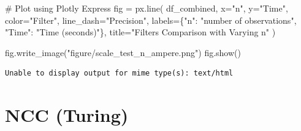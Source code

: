 \documentclass[
]{report}
\newenvironment{Shaded}{\begin{snugshade}}{\end{snugshade}}
\newcommand{\CommentTok}[1]{\textcolor[rgb]{0.37,0.37,0.37}{#1}}
\newcommand{\NormalTok}[1]{\textcolor[rgb]{0.00,0.23,0.31}{#1}}
\newcommand{\OperatorTok}[1]{\textcolor[rgb]{0.37,0.37,0.37}{#1}}
\newcommand{\StringTok}[1]{\textcolor[rgb]{0.13,0.47,0.30}{#1}}
\begin{document}
\begin{Shaded}
\begin{Highlighting}[]
\CommentTok{\# Plot using Plotly Express}
\NormalTok{fig }\OperatorTok{=}\NormalTok{ px.line(}
\NormalTok{    df\_combined,}
\NormalTok{    x}\OperatorTok{=}\StringTok{"n"}\NormalTok{,}
\NormalTok{    y}\OperatorTok{=}\StringTok{"Time"}\NormalTok{,}
\NormalTok{    color}\OperatorTok{=}\StringTok{"Filter"}\NormalTok{,}
\NormalTok{    line\_dash}\OperatorTok{=}\StringTok{"Precision"}\NormalTok{,}
\NormalTok{    labels}\OperatorTok{=}\NormalTok{\{}\StringTok{"n"}\NormalTok{: }\StringTok{"number of observations"}\NormalTok{, }\StringTok{"Time"}\NormalTok{: }\StringTok{"Time (seconds)"}\NormalTok{\},}
\NormalTok{    title}\OperatorTok{=}\StringTok{"Filters Comparison with Varying n"}
\NormalTok{)}

\NormalTok{fig.write\_image(}\StringTok{"figure/scale\_test\_n\_ampere.png"}\NormalTok{)}
\NormalTok{fig.show()}
\end{Highlighting}
\end{Shaded}

\begin{verbatim}
Unable to display output for mime type(s): text/html
\end{verbatim}

\chapter{NCC (Turing)}\label{ncc-turing}
\end{document}
